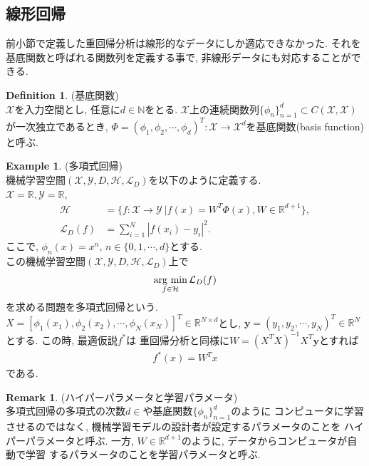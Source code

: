 \documentclass[11pt, a4paper, dvipdfmx]{jsarticle}
\theoremstyle{definition}
\newtheorem{Definition+}[Axiom+]{Definition}
\newtheorem{Example+}[Axiom+]{Example}
\newtheorem{Remark+}[Axiom+]{Remark}
\newcommand{\N}{\mathbb{N}}
\newcommand{\R}{\mathbb{R}}
\newcommand{\X}{\mathcal{X}}
\newcommand{\Y}{\mathcal{Y}}
\newcommand{\Hil}{\mathcal{H}}
\newcommand{\Loss}{\mathcal{L}_{D}}
\newcommand{\MLsp}{(\X, \Y, D, \Hil, \Loss)}
\newcommand{\argmin}{\mathop{\rm arg~min}\limits}
\begin{document}
\subsection{線形回帰}
前小節で定義した重回帰分析は線形的なデータにしか適応できなかった. それを
基底関数と呼ばれる関数列を定義する事で, 非線形データにも対応することができる.
\begin{Definition+}(基底関数)\\
    $\X$を入力空間とし, 任意に$d\in\N$をとる. $\X$上の連続関数列$\{\phi_{n}\}_{n = 1}^{d}\subset C(\X, \X)$
    が一次独立であるとき, $\Phi = (\phi_1, \phi_2, \cdots, \phi_d)^{T}:\X\to\X^{d}$を基底関数(basis function)と呼ぶ.
\end{Definition+}
\begin{Example+}(多項式回帰)\\
    機械学習空間$\MLsp$を以下のように定義する.\\
    $\X = \R, \Y = \R$, 
    \begin{align*}
        \Hil &= \{f:\X\to\Y~| f(x) = W^{T}\Phi(x), W\in\R^{d + 1}\},\\
        \Loss(f) &= \sum_{i = 1}^{N}|f(x_i) - y_i|^2.
    \end{align*}
    ここで, $\phi_{n}(x) = x^{n}$, $n\in\{0, 1, \cdots, d\}$とする.\\
    この機械学習空間$\MLsp$上で
    \begin{align*}
        \argmin_{f\in\Hil}\Loss(f)
    \end{align*}
    を求める問題を多項式回帰という. $X = [\phi_{1}(x_1), \phi_{2}(x_{2}), \cdots, \phi_{N}(x_N)]^{T}\in\R^{N\times d}$とし, 
    $\mathbf{y} = (y_{1}, y_{2}, \cdots, y_{N})^{T}\in\R^{N}$とする. この時, 最適仮説$f^{*}$は
    重回帰分析と同様に$W = (X^TX)^{-1}X^T\mathbf{y}$とすれば
    \begin{align*}
        f^{*}(x) = W^{T}x
    \end{align*}
    である. 
\end{Example+}
\begin{Remark+}(ハイパーパラメータと学習パラメータ)\\
    多項式回帰の多項式の次数$d\in$や基底関数$\{\phi_{n}\}_{n = 1}^{d}$のように
    コンピュータに学習させるのではなく, 機械学習モデルの設計者が設定するパラメータのことを
    ハイパーパラメータと呼ぶ. 一方, $W\in\R^{d + 1}$のように, データからコンピュータが自動で学習
    するパラメータのことを学習パラメータと呼ぶ.
\end{Remark+}
\end{document}
